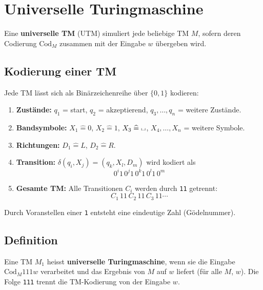 \section{Universelle Turingmaschine}
Eine \textbf{universelle TM} (UTM) simuliert jede beliebige TM $M$, sofern deren Codierung $\text{Cod}_M$ zusammen mit der Eingabe $w$ übergeben wird.

\subsection{Kodierung einer TM}
Jede TM lässt sich als Binärzeichenreihe über $\{0, 1\}$ kodieren:
\begin{enumerate}
    \item \textbf{Zustände:} $q_1$ = start, $q_2$ = akzeptierend, $q_3, \ldots, q_n$ = weitere Zustände.
    \item \textbf{Bandsymbole:} $X_1 \mathrel{\widehat{=}} 0$,\; $X_2 \mathrel{\widehat{=}} 1$,\; $X_3 \mathrel{\widehat{=}} \shortsqcup$,\; $X_4, \ldots , X_n$ = weitere Symbole.
    \item \textbf{Richtungen:} $D_1 \mathrel{\widehat{=}} L$,\; $D_2 \mathrel{\widehat{=}} R$.
    \item \textbf{Transition:} $\delta(q_i, X_j) = (q_k, X_l, D_m)$ wird kodiert als
    \[
        0^i 1\, 0^j 1\, 0^k 1\, 0^l 1\, 0^m
    \]
    \item \textbf{Gesamte TM:} Alle Transitionen $C_i$ werden durch \texttt{11} getrennt:
    \[
        C_1\, 11\, C_2\, 11\, C_3\, 11 \cdots
    \]
\end{enumerate}
Durch Voranstellen einer \texttt{1} entsteht eine eindeutige Zahl (Gödelnummer).

\subsection{Definition}
Eine TM $M_1$ heisst \textbf{universelle Turingmaschine}, wenn sie die Eingabe $\text{Cod}_M 111 w$ verarbeitet und das Ergebnis von $M$ auf $w$ liefert (für alle $M$, $w$). Die Folge \texttt{111} trennt die TM-Kodierung von der Eingabe $w$.


